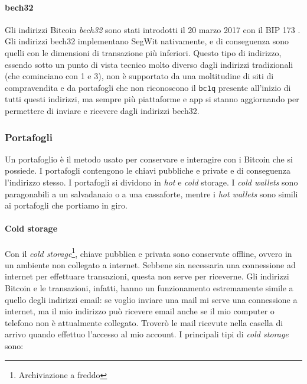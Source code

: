 \documentclass {article}
\begin{document}
\paragraph {bech32}

Gli indirizzi Bitcoin \textit{bech32} sono stati introdotti il 20 marzo 2017 con il BIP 173 \cite{bip173}.
Gli indirizzi bech32 implementano SegWit nativamente, e di conseguenza sono quelli con le dimensioni di transazione più inferiori.
Questo tipo di indirizzo, essendo sotto un punto di vista tecnico molto diverso dagli indirizzi tradizionali (che cominciano con 1 e 3), non è supportato da una moltitudine di siti di compravendita e da portafogli che non riconoscono il \texttt{bc1q} presente all'inizio di tutti questi indirizzi, ma sempre più piattaforme e app si stanno aggiornando per permettere di inviare e ricevere dagli indirizzi bech32.


\subsubsection {Portafogli}


Un portafoglio è il metodo usato per conservare e interagire con i Bitcoin che si possiede.
I portafogli contengono le chiavi pubbliche e private e di conseguenza l'indirizzo stesso.
I portafogli si dividono in \textit{hot} e \textit{cold} storage.
I \textit{cold wallets} sono paragonabili a un salvadanaio o a una cassaforte, mentre i \textit{hot wallets} sono simili ai portafogli che portiamo in giro.

\paragraph {Cold storage}

Con il \textit{cold storage}\footnote{Archiviazione a freddo}, chiave pubblica e privata sono conservate offline, ovvero in un ambiente non collegato a internet.
Sebbene sia necessaria una connessione ad internet per effettuare transazioni, questa non serve per riceverne.
Gli indirizzi Bitcoin e le transazioni, infatti, hanno un funzionamento estremamente simile a quello degli indirizzi email: se voglio inviare una mail mi serve una connessione a internet, ma il mio indirizzo può ricevere email anche se il mio computer o telefono non è attualmente collegato.
Troverò le mail ricevute nella casella di arrivo quando effettuo l'accesso al mio account.
I principali tipi di \textit{cold storage} sono:
\end{document}
